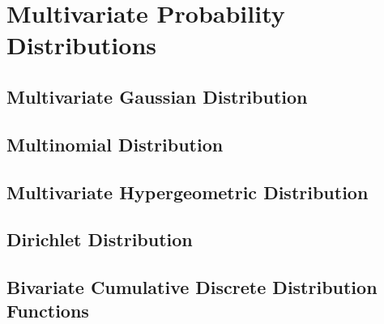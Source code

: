 \documentclass[11pt]{report} %
\begin{document}
\section{Multivariate Probability Distributions}

\subsection{Multivariate Gaussian Distribution}

\subsection{Multinomial Distribution}

\subsection{Multivariate Hypergeometric Distribution}

\subsection{Dirichlet Distribution}

\subsection{Bivariate Cumulative Discrete Distribution Functions}
\end{document}
